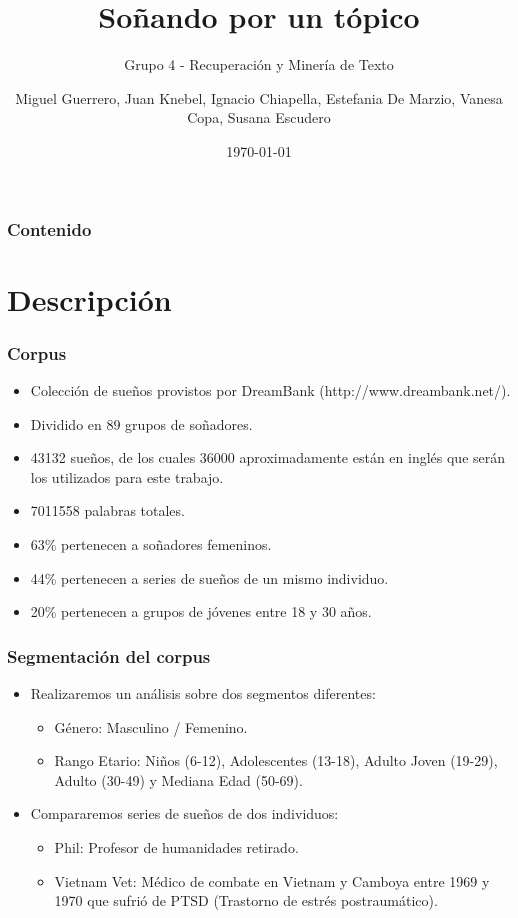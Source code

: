 \documentclass{beamer}
\title{Soñando por un tópico}
\subtitle{Grupo 4 - Recuperación y Minería de Texto}
\author{Miguel Guerrero, Juan Knebel, Ignacio Chiapella, Estefania De Marzio, Vanesa Copa, Susana Escudero}
\institute{Universidad de Buenos Aires}
\date{\today}
\begin{document}
\begin{frame}
  \titlepage
\end{frame}

\begin{frame}%
  \frametitle{Contenido}
  \tableofcontents[hideallsubsections]
\end{frame}

\section{Descripción}
\begin{frame}
\frametitle{Corpus}
\begin{itemize}
[triangle]
	\item Colección de sueños provistos por DreamBank (http://www.dreambank.net/).
	\item Dividido en 89 grupos de soñadores.
	\item 43132 sueños, de los cuales 36000 aproximadamente están en inglés que serán los utilizados para este trabajo.
	\item 7011558 palabras totales.
	\item 63\% pertenecen a soñadores femeninos.
	\item 44\% pertenecen a series de sueños de un mismo individuo.
	\item 20\% pertenecen a grupos de jóvenes entre 18 y 30 años.

\end{itemize}
\end{frame}

\begin{frame}
\frametitle{Segmentación del corpus}
\begin{itemize}
[triangle]
	\item Realizaremos un análisis sobre dos segmentos diferentes:
	\begin{itemize}
	[circle]
		\item Género: Masculino / Femenino.
		\item Rango Etario: Niños (6-12), Adolescentes (13-18), Adulto Joven (19-29), Adulto (30-49) y Mediana Edad (50-69).
	\end{itemize}
	
	\item Compararemos series de sueños de dos individuos:
	\begin{itemize}
	[circle]
		\item Phil: Profesor de humanidades retirado.
		\item Vietnam Vet: Médico de combate en Vietnam y Camboya entre 1969 y 1970 que sufrió de PTSD (Trastorno de estrés postraumático).
	\end{itemize}
\end{itemize}
\end{frame}
\end{document}

